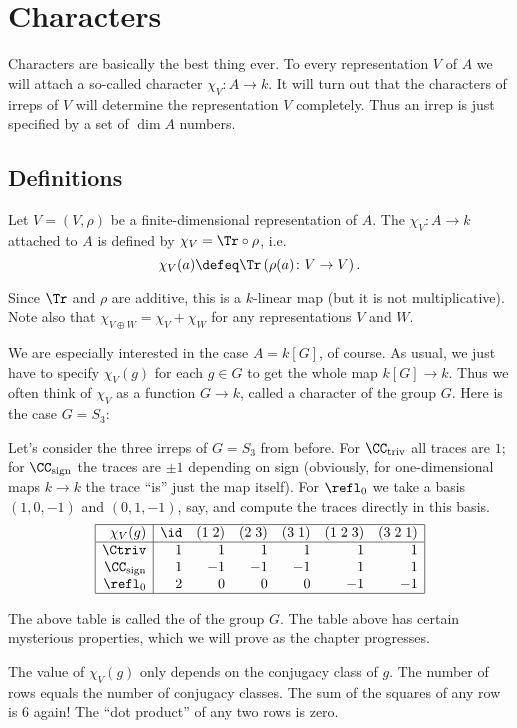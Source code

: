 \chapter{Characters}
Characters are basically the best thing ever.
To every representation $V$ of $A$ we will attach a
so-called character $\chi_V \colon A \to k$.
It will turn out that the characters of irreps of $V$
will determine the representation $V$ completely.
Thus an irrep is just specified by a set of $\dim A$ numbers.

\section{Definitions}
\begin{definition}
	Let $V = (V, \rho)$ be a finite-dimensional representation of $A$.
	The  $\chi_V \colon A \to k$ attached to
	$A$ is defined by $\chi_V = \Tr \circ \rho$, i.e.\
	\[ \chi_V(a) \defeq \Tr\left( \rho(a) \colon V \to V \right). \]
\end{definition}
Since $\Tr$ and $\rho$ are additive, this is a $k$-linear map
(but it is not multiplicative).
Note also that $\chi_{V \oplus W} = \chi_V + \chi_W$
for any representations $V$ and $W$.

We are especially interested in the case $A = k[G]$, of course.
As usual, we just have to specify $\chi_V(g)$ for each
$g \in G$ to get the whole map $k[G] \to k$.
Thus we often think of $\chi_V$ as a function $G \to k$,
called a character of the group $G$.
Here is the case $G = S_3$:
\begin{example}
	Let's consider the three irreps of $G = S_3$ from before.
	For $\CC_{\text{triv}}$ all traces are $1$;
	for $\CC_{\text{sign}}$ the traces are $\pm 1$ depending on sign
	(obviously, for one-dimensional maps $k \to k$ the trace ``is''
	just the map itself).
	For $\refl_0$ we take a basis $(1,0,-1)$ and $(0,1,-1)$, say,
	and compute the traces directly in this basis.
	\[
		\begin{array}{|r|rrrrrr|}
			\hline
			\chi_V(g) & \id & (1\;2) & (2\;3) & (3\;1)
				& (1\;2\;3) & (3\;2\;1)  \\ \hline
			\Ctriv & 1 & 1 & 1 & 1 & 1 & 1 \\
			\CC_{\mathrm{sign}} & 1 & -1 & -1 & -1 & 1 & 1 \\
			\refl_0 & 2 & 0 & 0 & 0 & -1 & -1 \\ \hline
		\end{array}
	\]
\end{example}
The above table is called the  of the group $G$.
The table above has certain mysterious properties,
which we will prove as the chapter progresses.
\begin{enumerate}[(I)]
	\ii The value of $\chi_V(g)$ only depends on the conjugacy class of $g$.
	\ii The number of rows equals the number of conjugacy classes.
	\ii The sum of the squares of any row is $6$ again!
	\ii The ``dot product'' of any two rows is zero.
\end{enumerate}

